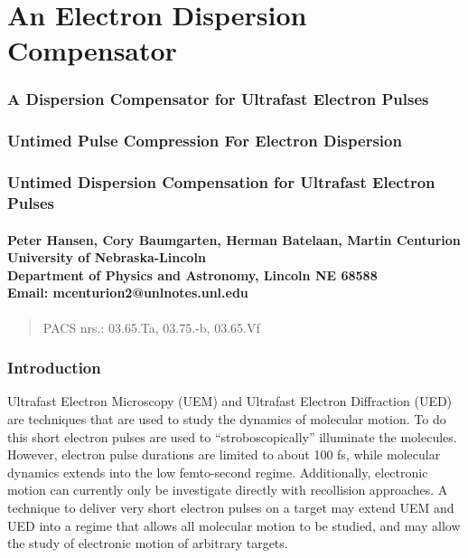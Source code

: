 \documentclass[12pt,letterpaper]{article}
\begin{document}
{
\centering
\part*{An Electron Dispersion Compensator}
\section*{A Dispersion Compensator for Ultrafast Electron Pulses}
\section*{Untimed Pulse Compression For Electron Dispersion}
\section*{Untimed Dispersion Compensation for Ultrafast Electron Pulses}

\subsection*{Peter Hansen, Cory Baumgarten, Herman Batelaan, Martin Centurion\\
University of Nebraska-Lincoln\\
Department of Physics and Astronomy, Lincoln NE 68588\\
Email: mcenturion2@unlnotes.unl.edu}
}

\begin{abstract}
   PACS nrs.: 03.65.Ta, 03.75.-b, 03.65.Vf
\end{abstract}

   \section{Introduction}

Ultrafast Electron Microscopy (UEM) and Ultrafast Electron Diffraction (UED) are techniques that are used to study the dynamics of molecular motion. To do this short electron pulses are used to ``stroboscopically'' illuminate the molecules. However, electron pulse durations are limited to about 100 fs, while molecular dynamics extends into the low femto-second regime. Additionally, electronic motion can currently only be investigate directly with recollision approaches. A technique to deliver very short electron pulses on a target may extend UEM and UED into a regime that allows all molecular motion to be studied, and may allow the study of electronic motion of arbitrary targets.
\end{document}
